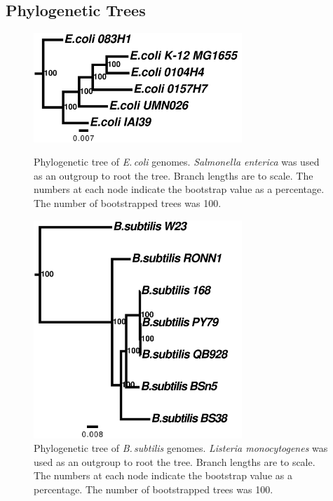 \documentclass[11pt]{article}
\newcommand{\salm}{\textit{Salmonella enterica}\xspace}
\newcommand{\ecol}{\textit{E.\,coli}\xspace}
\newcommand{\lis}{\textit{Listeria monocytogenes}\xspace}
\newcommand{\bass}{\textit{B.\,subtilis}\xspace}
\begin{document}
	\subsection{Phylogenetic Trees}
	\begin{figure}[H]
		\begin{center}
			\includegraphics[width=0.7\textwidth]{./figs/Ecoli_chrom_ref_tree_figtree_raw_29Aug20.pdf}
			\caption{\label{fig:ecolitree} Phylogenetic tree of \ecol genomes. \salm was used as an outgroup to root the tree. Branch lengths are to scale. The numbers at each node indicate the bootstrap value as a percentage. The number of bootstrapped trees was 100.}
		\end{center}
	\vspace*{\floatsep}%
	
		\begin{center}
			\includegraphics[width=0.7\textwidth]{./figs/bass_chrom_ref_tree_figtree_raw_29Aug20.pdf}
			\caption{\label{fig:basstree} Phylogenetic tree of \bass genomes. \lis was used as an outgroup to root the tree. Branch lengths are to scale. The numbers at each node indicate the bootstrap value as a percentage. The number of bootstrapped trees was 100.}
		\end{center}
			
		\end{figure}
		
\end{document}

